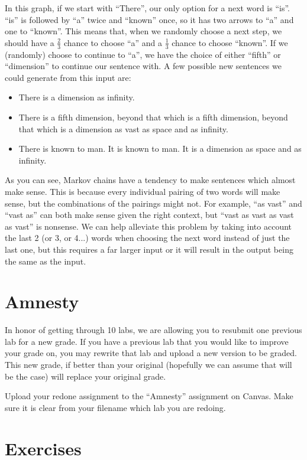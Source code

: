 \documentclass[11pt]{cselabheader}
\begin{document}
In this graph, if we start with ``There'', our only option for a next word is ``is''. ``is'' is followed by ``a'' twice and ``known'' once, so it has two arrows to ``a'' and one to ``known''. This means that, when we randomly choose a next step, we should have a $\frac{2}{3}$ chance to choose ``a'' and a $\frac{1}{3}$ chance to choose ``known''. If we (randomly) choose to continue to ``a'', we have the choice of either ``fifth'' or ``dimension'' to continue our sentence with. A few possible new sentences we could generate from this input are:
\begin{itemize}
\item There is a dimension as infinity.
\item There is a fifth dimension, beyond that which is a fifth dimension, beyond that which is a dimension as vast as space and as infinity.
\item There is known to man. It is known to man. It is a dimension as space and as infinity.
\end{itemize}

As you can see, Markov chains have a tendency to make sentences which almost make sense. This is because every individual pairing of two words will make sense, but the combinations of the pairings might not. For example, ``as vast'' and ``vast as'' can both make sense given the right context, but ``vast as vast as vast as vast'' is nonsense. We can help alleviate this problem by taking into account the last 2 (or 3, or 4...) words when choosing the next word instead of just the last one, but this requires a far larger input or it will result in the output being the same as the input.


\section{Amnesty}
\label{sec:amnesty}
In honor of getting through 10 labs, we are allowing you to resubmit one previous lab for a new grade. If you have a previous lab that you would like to improve your grade on, you may rewrite that lab and upload a new version to be graded. This new grade, if better than your original (hopefully we can assume that will be the case) will replace your original grade.

Upload your redone assignment to the ``Amnesty'' assignment on Canvas.
Make sure it is clear from your filename which lab you are redoing.

\pagebreak

\section{Exercises}
\label{sec:ex}
\end{document}
